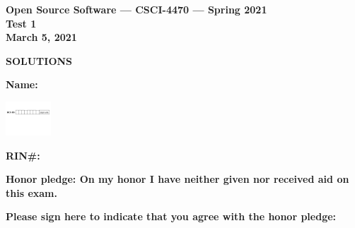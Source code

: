 \documentclass[10pt]{article}
\begin{document}
\thispagestyle{empty}

\vspace*{0.5in}

\begin{center}
\Large
\textbf{Open Source Software --- CSCI-4470 --- Spring 2021} \\
\textbf{Test 1} \\
\textbf{March 5, 2021}
\end{center}


\beginanswers
\begin{center}
\Large
\textbf{SOLUTIONS}
\end{center}

\else


\begin{center}

\textbf{\Large Name:} \underline {\hspace{2.0in}} \\

\bigskip
\bigskip

\centerline{
\includegraphics[height=0.5in]{boxes}
}


\bigskip

\textbf{\Large RIN\#:} \underline {\hspace{1.5in}}  

\vspace*{0.4in}
{\large\bf Honor pledge: On my honor I have neither given
nor received aid on this exam.}

\vspace*{0.1in}
{\large\bf Please sign here to indicate that you agree with the honor pledge: \underline {\hspace{1.5in}}}
\end{center}
\end{document}
